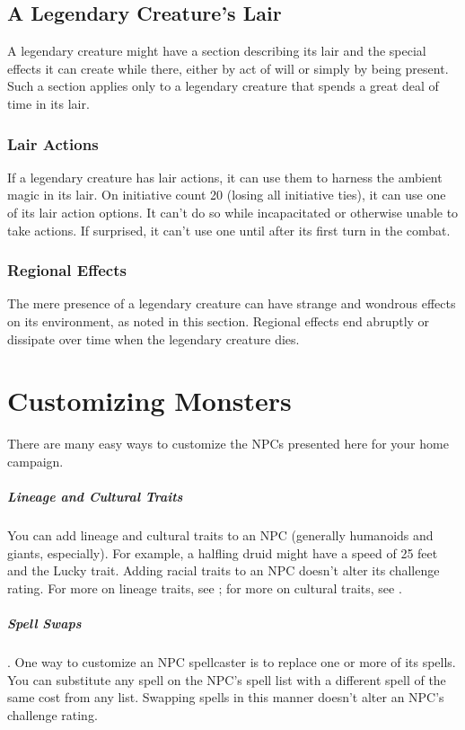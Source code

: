 \subsection{A Legendary Creature's Lair}

A legendary creature might have a section describing its lair and the special effects it can create while there, either by act of will or simply by being present. Such a section applies only to a legendary creature that spends a great deal of time in its lair.

\subsubsection{Lair Actions}

If a legendary creature has lair actions, it can use them to harness the ambient magic in its lair. On initiative count 20 (losing all initiative ties), it can use one of its lair action options. It can't do so while incapacitated or otherwise unable to take actions. If surprised, it can't use one until after its first turn in the combat.

\subsubsection{Regional Effects}

The mere presence of a legendary creature can have strange and wondrous effects on its environment, as noted in this section. Regional effects end abruptly or dissipate over time when the legendary creature dies.

\section{Customizing Monsters}

There are many easy ways to customize the NPCs presented here for your home campaign.

\subparagraph*{Lineage and Cultural Traits} You can add lineage and cultural traits to an NPC (generally humanoids and giants, especially). For example, a halfling druid might have a speed of 25 feet and the Lucky trait. Adding racial traits to an NPC doesn't alter its challenge rating. For more on lineage traits, see ; for more on cultural traits, see .

\subparagraph*{Spell Swaps}. One way to customize an NPC spellcaster is to replace one or more of its spells. You can substitute any spell on the NPC's spell list with a different spell of the same cost from any list. Swapping spells in this manner doesn't alter an NPC's challenge rating.

